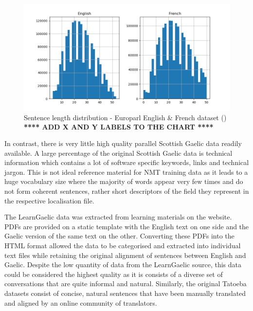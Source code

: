 \begin{figure}[ht!]
\centering
\includegraphics[width=1\textwidth]{media/methodology/sentence-length-chart.png}
\captionsetup{justification=centering,font=Large}
\caption[Diagram of the Europarl dataset sentence length distribution]{Sentence length distribution - Europarl English \& French dataset (\cite{french_corpus_2005}) \\ \textbf{**** ADD X AND Y LABELS TO THE CHART ****}}
\label{fig:sentence_length}
\end{figure}

In contrast, there is very little high quality parallel Scottish Gaelic data readily available. A large percentage of the original Scottish Gaelic data is technical information which contains a lot of software specific keywords, links and technical jargon. This is not ideal reference material for \acrshort{NMT} training data as it leads to a huge vocabulary size where the majority of words appear very few times and do not form coherent sentences, rather short descriptors of the field they represent in the respective localisation file. 

The LearnGaelic data was extracted from learning materials on the \cite{learn_gaelic_2019} website. PDFs are provided on a static template with the English text on one side and the Gaelic version of the same text on the other. Converting these PDFs into the HTML format allowed the data to be categorised and extracted into individual text files while retaining the original alignment of sentences between English and Gaelic.
Despite the low quantity of data from the LearnGaelic source, this data could be considered the highest quality as it is consists of a diverse set of conversations that are quite informal and natural. Similarly, the original Tatoeba datasets consist of concise, natural sentences that have been manually translated and aligned by an online community of translators.

